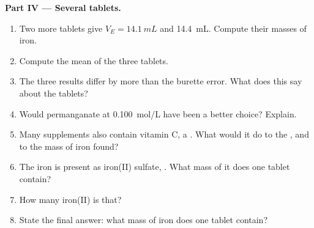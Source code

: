 \begin{problem}
\medskip
\noindent\textbf{Part IV --- Several tablets.}
\begin{enumerate}[resume]
  \item Two more tablets give $V_E = \qty{14.1}{mL}$ and
        \qty{14.4}{mL}. Compute their masses of iron.
  \item Compute the mean of the three tablets.
  \item The three results differ by more than the burette error. What
        does this say about the tablets?
  \item Would permanganate at \qty{0.100}{mol/L} have been a better
        choice? Explain.
  \item Many supplements also contain vitamin C, a . What would
        it do to the , and to the mass of iron found?
  \item The iron is present as iron(II) sulfate, . What mass of
        it does one tablet contain?
  \item How many iron(II)  is that?
  \item State the final answer: what mass of iron does one tablet
        contain?
\end{enumerate}
\end{problem}
